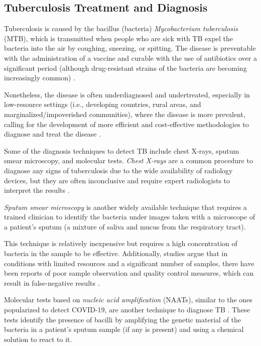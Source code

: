 \documentclass[../main.tex]{subfiles}
\begin{document}
    \subsection{Tuberculosis Treatment and Diagnosis} \label{sec:tuberculosis_data}

    Tuberculosis is caused by the bacillus (bacteria) \textit{Mycobacterium tuberculosis} (MTB), which is transmitted when people who are sick with TB expel the bacteria into the air by coughing, sneezing, or spitting. The disease is preventable with the administration of a vaccine and curable with the use of antibiotics over a significant period (although drug-resistant strains of the bacteria are becoming increasingly common) \cite{who_tuberculosis_2023}.
    
    Nonetheless, the disease is often underdiagnosed and undertreated, especially in low-resource settings (i.e., developing countries, rural areas, and marginalized/impoverished communities), where the disease is more prevalent, calling for the development of more efficient and cost-effective methodologies to diagnose and treat the disease \cite{who_global_2022, imi_era4tb_2020,  who_tuberculosis_2023}.

    Some of the diagnosis techniques to detect TB include chest X-rays, sputum smear microscopy, and molecular tests. \textit{Chest X-rays} are a common procedure to diagnose any signs of tuberculosis due to the wide availability of radiology devices, but they are often inconclusive and require expert radiologists to interpret the results \cite{escalante_tuberculosis_2009}.
    
    \textit{Sputum smear microscopy} is another widely available technique that requires a trained clinician to identify the bacteria under images taken with a microscope of a patient's sputum (a mixture of saliva and mucus from the respiratory tract). 
    
    This technique is relatively inexpensive but requires a high concentration of bacteria in the sample to be effective. Additionally, studies argue that in conditions with limited resources and a significant number of samples, there have been reports of poor sample observation and quality control measures, which can result in false-negative results \cite{desikan_sputum_2013}.
    
    Molecular tests based on \textit{nucleic acid amplification} (NAATs), similar to the ones popularized to detect COVID-19, are another technique to diagnose TB \cite{cdc_tb_2016}. These tests identify the presence of bacilli by amplifying the genetic material of the bacteria in a patient's sputum sample (if any is present) and using a chemical solution to react to it. 
    
\end{document}
